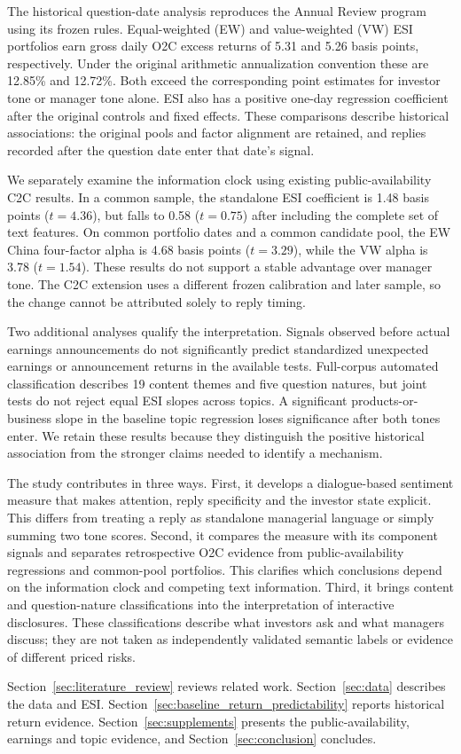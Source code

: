 The historical question-date analysis reproduces the Annual Review program using its frozen rules. Equal-weighted (EW) and value-weighted (VW) ESI portfolios earn gross daily O2C excess returns of 5.31 and 5.26 basis points, respectively. Under the original arithmetic annualization convention these are 12.85\% and 12.72\%. Both exceed the corresponding point estimates for investor tone or manager tone alone. ESI also has a positive one-day regression coefficient after the original controls and fixed effects. These comparisons describe historical associations: the original pools and factor alignment are retained, and replies recorded after the question date enter that date's signal.

We separately examine the information clock using existing public-availability C2C results. In a common sample, the standalone ESI coefficient is 1.48 basis points ($t=4.36$), but falls to 0.58 ($t=0.75$) after including the complete set of text features. On common portfolio dates and a common candidate pool, the EW China four-factor alpha is 4.68 basis points ($t=3.29$), while the VW alpha is 3.78 ($t=1.54$). These results do not support a stable advantage over manager tone. The C2C extension uses a different frozen calibration and later sample, so the change cannot be attributed solely to reply timing.

Two additional analyses qualify the interpretation. Signals observed before actual earnings announcements do not significantly predict standardized unexpected earnings or announcement returns in the available tests. Full-corpus automated classification describes 19 content themes and five question natures, but joint tests do not reject equal ESI slopes across topics. A significant products-or-business slope in the baseline topic regression loses significance after both tones enter. We retain these results because they distinguish the positive historical association from the stronger claims needed to identify a mechanism.

The study contributes in three ways. First, it develops a dialogue-based sentiment measure that makes attention, reply specificity and the investor state explicit. This differs from treating a reply as standalone managerial language or simply summing two tone scores. Second, it compares the measure with its component signals and separates retrospective O2C evidence from public-availability regressions and common-pool portfolios. This clarifies which conclusions depend on the information clock and competing text information. Third, it brings content and question-nature classifications into the interpretation of interactive disclosures. These classifications describe what investors ask and what managers discuss; they are not taken as independently validated semantic labels or evidence of different priced risks.

Section~\ref{sec:literature_review} reviews related work. Section~\ref{sec:data} describes the data and ESI. Section~\ref{sec:baseline_return_predictability} reports historical return evidence. Section~\ref{sec:supplements} presents the public-availability, earnings and topic evidence, and Section~\ref{sec:conclusion} concludes.
